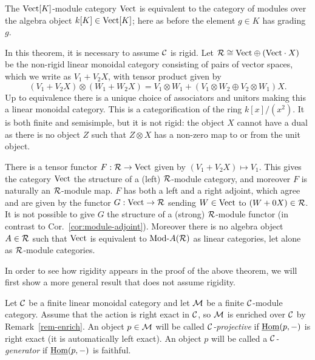 \documentclass{amsart}
\begin{document}
\begin{example} \label{eg:vect}
The $\mathrm{Vect}[K]$-module category $\mathrm{Vect}$ is equivalent to the category of modules over the algebra object $k[K] \in \mathrm{Vect}[K]$; here as before the element $g \in K$ has grading $g$.  
\end{example}

\begin{example} \label{ex:lax-module}
	In this theorem, it is necessary to assume $\mathcal C$ is rigid.  Let $\mathcal R \cong \mathrm{Vect} \oplus (\mathrm{Vect} \cdot X)$ be the non-rigid linear monoidal category consisting of pairs of vector spaces, which we write as $V_1 + V_2 X$, with tensor product given by 
	\begin{equation*}
		(V_1 + V_2 X) \otimes (W_1 + W_2 X) = V_1 \otimes W_1  +  (V_1 \otimes W_2 \oplus V_2 \otimes W_1)X.
	\end{equation*} 
	Up to equivalence there is a unique choice of associators and unitors making this a linear monoidal category. 
This is a categorification of the ring $k[x]/(x^2)$.  It is both finite and semisimple, but it is not rigid: the object $X$ cannot have a dual as there is no object $Z$ such that $Z \otimes X$ has a non-zero map to or from the unit object. 
	
	There is a tensor functor $F:\mathcal R \to \mathrm{Vect}$ given by $(V_1 + V_2 X) \mapsto V_1$. This gives the category $\mathrm{Vect}$ the structure of a (left) $\mathcal R$-module category, and moreover $F$ is naturally an $\mathcal R$-module map. $F$ has both a left and a right adjoint, which agree and are given by the functor $G: \mathrm{Vect} \to \mathcal R$ sending $W \in \mathrm{Vect}$ to $(W + 0 X) \in \mathcal R$. 
	It is not possible to give $G$ the structure of a (strong) $\mathcal R$-module functor (in contrast to Cor.~\ref{cor:module-adjoint}). Moreover there is no algebra object $A \in \mathcal R$ such that $\mathrm{Vect}$ is equivalent to $\Mod{}{A}(\cR)$ as linear categories, let alone as $\mathcal R$-module categories. 
\end{example}

In order to see how rigidity appears in the proof of the above theorem, we will first show a more general result that does not assume rigidity.

\begin{definition}
	Let $\mathcal C$ be a finite linear monoidal category and let $\mathcal M$ be a finite $\mathcal C$-module category. Assume that the action is right exact in $\mathcal C$, so $\mathcal M$ is enriched over $\mathcal C$ by Remark~\ref{rem-enrich}. 
	An object $p \in \mathcal M$ will be called {\em $\mathcal C$-projective} if $\operatorname{\underline{Hom}}(p, -)$ is right exact (it is automatically left exact). An object $p$ will be called a {\em $\mathcal C$-generator} if $\operatorname{\underline{Hom}}(p,-)$ is faithful.
\end{definition}
\end{document}

